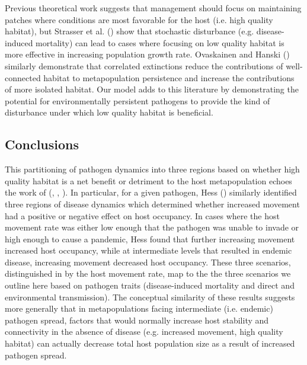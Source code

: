 \documentclass{article}
\begin{document}
Previous theoretical work suggests that management should focus on maintaining patches where conditions are most favorable for the host (i.e. high quality habitat), but Strasser et al. (\cite{Strasser2010}) show that stochastic disturbance (e.g. disease-induced mortality) can lead to cases where focusing on low quality habitat is more effective in increasing population growth rate.
Ovaskainen and Hanski (\cite{Ovaskainen2003a}) similarly demonstrate that correlated extinctions reduce the contributions of well-connected habitat to metapopulation persistence and increase the contributions of more isolated habitat.
Our model adds to this literature by demonstrating the potential for environmentally persistent pathogens to provide the kind of disturbance under which low quality habitat is beneficial.

\subsection*{Conclusions}  

This partitioning of pathogen dynamics into three regions based on whether high quality habitat is a net benefit or detriment to the host metapopulation echoes the work of (\cite{Hess1996}, \cite{Gog2002}, \cite{Park2012}).
In particular, for a given pathogen, Hess (\cite{Hess1996}) similarly identified three regions of disease dynamics which determined whether increased movement had a positive or negative effect on host occupancy.  
In cases where the host movement rate was either low enough that the pathogen was unable to invade or high enough to cause a pandemic, Hess found that further increasing movement increased host occupancy, while at intermediate levels that resulted in endemic disease, increasing movement decreased host occupancy.
These three scenarios, distinguished in \cite{Hess1996} by the host movement rate, map to the the three scenarios we outline here based on pathogen traits (disease-induced mortality and direct and environmental transmission).
The conceptual similarity of these results suggests more generally that in metapopulations facing intermediate (i.e. endemic) pathogen spread, factors that would normally increase host stability and connectivity in the absence of disease (e.g. increased movement, high quality habitat) can actually decrease total host population size as a result of increased pathogen spread.
\end{document}
